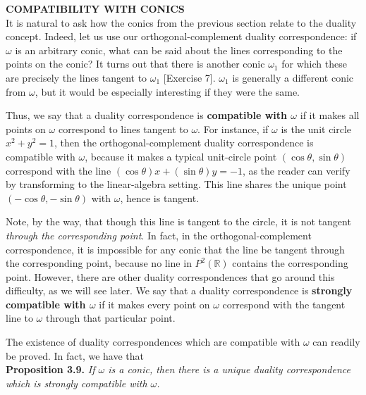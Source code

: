\documentclass[leqno]{book}
\begin{document}
\noindent\textbf{COMPATIBILITY WITH CONICS}\\

\noindent It is natural to ask how the conics from the previous section relate to the duality concept.  Indeed, let us use our orthogonal-complement duality correspondence: if $\omega$ is an arbitrary conic, what can be said about the lines corresponding to the points on the conic?  It turns out that there is another conic $\omega_1$ for which these are precisely the lines tangent to $\omega_1$ [Exercise 7].  $\omega_1$ is generally a different conic from $\omega$, but it would be especially interesting if they were the same.

Thus, we say that a duality correspondence is \textbf{compatible with $\omega$} if it makes all points on $\omega$ correspond to lines tangent to $\omega$.  For instance, if $\omega$ is the unit circle $x^2+y^2=1$, then the orthogonal-complement duality correspondence is compatible with $\omega$, because it makes a typical unit-circle point $(\cos\theta,\sin\theta)$ correspond with the line $(\cos\theta)x+(\sin\theta)y=-1$, as the reader can verify by transforming to the linear-algebra setting.  This line shares the unique point $(-\cos\theta,-\sin\theta)$ with $\omega$, hence is tangent.

Note, by the way, that though this line is tangent to the circle, it is not tangent \emph{through the corresponding point}.  In fact, in the orthogonal-complement correspondence, it is impossible for any conic that the line be tangent through the corresponding point, because no line in $P^2(\mathbb R)$ contains the corresponding point.  However, there are other duality correspondences that go around this difficulty, as we will see later.  We say that a duality correspondence is \textbf{strongly compatible with $\omega$} if it makes every point on $\omega$ correspond with the tangent line to $\omega$ through that particular point.

The existence of duality correspondences which are compatible with $\omega$ can readily be proved.  In fact, we have that\\

\noindent\textbf{Proposition 3.9.} \emph{If $\omega$ is a conic, then there is a unique duality correspondence which is strongly compatible with $\omega$.}\\
\end{document}
